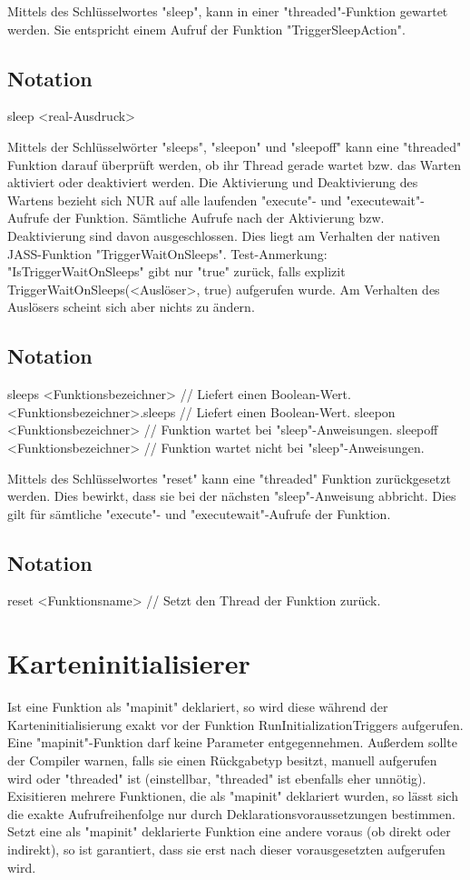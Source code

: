 Mittels des Schlüsselwortes "sleep", kann in einer "threaded"-Funktion gewartet werden.
Sie entspricht einem Aufruf der Funktion "TriggerSleepAction".

\subsection{Notation}
sleep <real-Ausdruck>

Mittels der Schlüsselwörter "sleeps", "sleepon" und "sleepoff" kann eine "threaded" Funktion darauf überprüft werden, ob ihr Thread gerade wartet bzw.
das Warten aktiviert oder deaktiviert werden.
Die Aktivierung und Deaktivierung des Wartens bezieht sich NUR auf alle laufenden "execute"- und "executewait"-Aufrufe der Funktion.
Sämtliche Aufrufe nach der Aktivierung bzw. Deaktivierung sind davon ausgeschlossen.
Dies liegt am Verhalten der nativen JASS-Funktion "TriggerWaitOnSleeps".
Test-Anmerkung:
"IsTriggerWaitOnSleeps" gibt nur "true" zurück, falls explizit TriggerWaitOnSleeps(<Auslöser>, true) aufgerufen wurde. Am Verhalten des Auslösers
scheint sich aber nichts zu ändern.

\subsection{Notation}
sleeps <Funktionsbezeichner> // Liefert einen Boolean-Wert.
<Funktionsbezeichner>.sleeps // Liefert einen Boolean-Wert.
sleepon <Funktionsbezeichner> // Funktion wartet bei "sleep"-Anweisungen.
sleepoff <Funktionsbezeichner> // Funktion wartet nicht bei "sleep"-Anweisungen.

Mittels des Schlüsselwortes "reset" kann eine "threaded" Funktion zurückgesetzt werden. Dies bewirkt, dass sie bei der nächsten "sleep"-Anweisung
abbricht. Dies gilt für sämtliche "execute"- und "executewait"-Aufrufe der Funktion.

\subsection{Notation}
reset <Funktionsname> // Setzt den Thread der Funktion zurück.

\section{Karteninitialisierer}
Ist eine Funktion als "mapinit" deklariert, so wird diese während der Karteninitialisierung exakt vor der Funktion RunInitializationTriggers 
aufgerufen. Eine "mapinit"-Funktion darf keine Parameter entgegennehmen. Außerdem sollte der Compiler warnen, falls sie einen Rückgabetyp besitzt, 
manuell aufgerufen wird oder "threaded" ist (einstellbar, "threaded" ist ebenfalls eher unnötig).
Exisitieren mehrere Funktionen, die als "mapinit" deklariert wurden, so lässt sich die exakte Aufrufreihenfolge nur durch Deklarationsvoraussetzungen
bestimmen.
Setzt eine als "mapinit" deklarierte Funktion eine andere voraus (ob direkt oder indirekt), so ist garantiert, dass sie erst nach dieser vorausgesetzten
aufgerufen wird.

